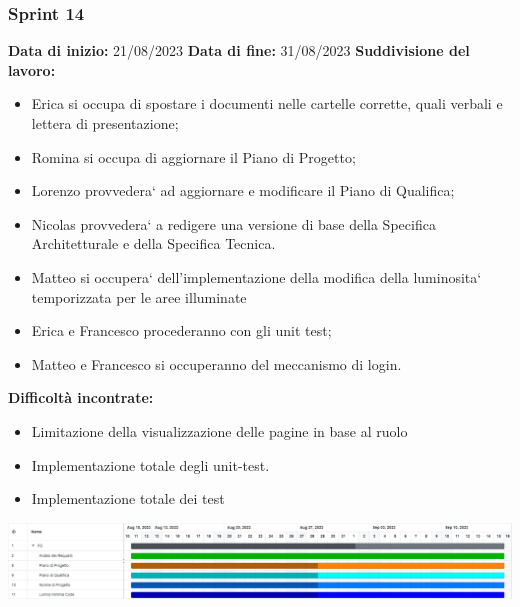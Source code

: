 \documentclass[a4paper, 12pt]{article}
\begin{document}
\subsubsection{Sprint 14}
\textbf{Data di inizio:} 21/08/2023\newline
\textbf{Data di fine:} 31/08/2023\newline
\newline
\textbf{Suddivisione del lavoro:}
\begin{itemize}
	\item Erica si occupa di spostare i documenti nelle cartelle corrette, quali verbali e lettera di presentazione;
	\item Romina si occupa di aggiornare il Piano di Progetto;
	\item Lorenzo provvedera` ad aggiornare e modificare il Piano di Qualifica;
	\item Nicolas provvedera` a redigere una versione di base della Specifica Architetturale e della Specifica Tecnica.
	\item Matteo si occupera` dell’implementazione della modifica della luminosita` temporizzata per le aree illuminate
	\item Erica e Francesco procederanno con gli unit test;
	\item Matteo e Francesco si occuperanno del meccanismo di login.
\end{itemize}
\textbf{Difficoltà incontrate:}
\begin{itemize}
	\item Limitazione della visualizzazione delle pagine in base al ruolo
	\item Implementazione totale degli unit-test.
	\item Implementazione totale dei test
\end{itemize}
\includegraphics[scale=0.178]{PB_2.png}\newline
\newline
\end{document}
